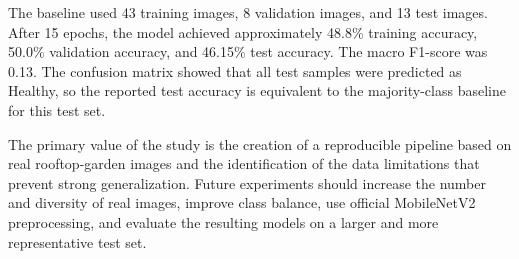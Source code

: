 \documentclass[conference]{IEEEtran}
\begin{document}
The baseline used 43 training images, 8 validation images, and 13 test images. After 15 epochs, the model achieved approximately 48.8\% training accuracy, 50.0\% validation accuracy, and 46.15\% test accuracy. The macro F1-score was 0.13. The confusion matrix showed that all test samples were predicted as Healthy, so the reported test accuracy is equivalent to the majority-class baseline for this test set.

The primary value of the study is the creation of a reproducible pipeline based on real rooftop-garden images and the identification of the data limitations that prevent strong generalization. Future experiments should increase the number and diversity of real images, improve class balance, use official MobileNetV2 preprocessing, and evaluate the resulting models on a larger and more representative test set.



\end{document}
